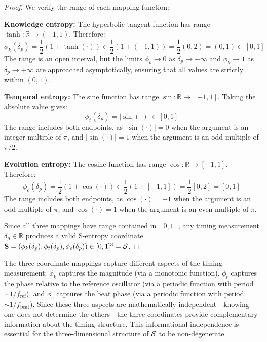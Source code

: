 \begin{proof}
We verify the range of each mapping function:

\textbf{Knowledge entropy:} The hyperbolic tangent function has range $\tanh: \mathbb{R} \to (-1, 1)$. Therefore:
\begin{equation}
\phi_k(\delta_p) = \frac{1}{2}(1 + \tanh(\cdot)) \in \frac{1}{2}(1 + (-1, 1)) = \frac{1}{2}(0, 2) = (0, 1) \subset [0,1]
\end{equation}
The range is an open interval, but the limits $\phi_k \to 0$ as $\delta_p \to -\infty$ and $\phi_k \to 1$ as $\delta_p \to +\infty$ are approached asymptotically, ensuring that all values are strictly within $(0,1)$.

\textbf{Temporal entropy:} The sine function has range $\sin: \mathbb{R} \to [-1, 1]$. Taking the absolute value gives:
\begin{equation}
\phi_t(\delta_p) = |\sin(\cdot)| \in [0, 1]
\end{equation}
The range includes both endpoints, as $|\sin(\cdot)| = 0$ when the argument is an integer multiple of $\pi$, and $|\sin(\cdot)| = 1$ when the argument is an odd multiple of $\pi/2$.

\textbf{Evolution entropy:} The cosine function has range $\cos: \mathbb{R} \to [-1, 1]$. Therefore:
\begin{equation}
\phi_e(\delta_p) = \frac{1}{2}(1 + \cos(\cdot)) \in \frac{1}{2}(1 + [-1, 1]) = \frac{1}{2}[0, 2] = [0, 1]
\end{equation}
The range includes both endpoints, as $\cos(\cdot) = -1$ when the argument is an odd multiple of $\pi$, and $\cos(\cdot) = 1$ when the argument is an even multiple of $\pi$.

Since all three mappings have range contained in $[0,1]$, any timing measurement $\delta_p \in \mathbb{R}$ produces a valid S-entropy coordinate $\mathbf{S} = (\phi_k(\delta_p), \phi_t(\delta_p), \phi_e(\delta_p)) \in [0,1]^3 = \mathcal{S}$.
\end{proof}

\begin{remark}
\label{rem:informational_independence}
The three coordinate mappings capture different aspects of the timing measurement: $\phi_k$ captures the magnitude (via a monotonic function), $\phi_t$ captures the phase relative to the reference oscillator (via a periodic function with period $\sim 1/f_{\text{ref}}$), and $\phi_e$ captures the beat phase (via a periodic function with period $\sim 1/f_{\text{beat}}$). Since these three aspects are mathematically independent—knowing one does not determine the others—the three coordinates provide complementary information about the timing structure. This informational independence is essential for the three-dimensional structure of $\mathcal{S}$ to be non-degenerate.
\end{remark}

